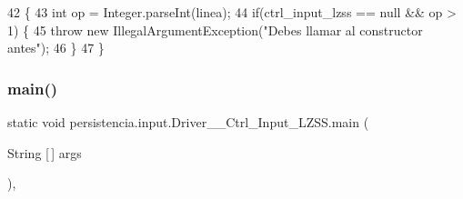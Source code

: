 \begin{DoxyCode}
42                                                                                           \{
43         \textcolor{keywordtype}{int} op = Integer.parseInt(linea);
44         \textcolor{keywordflow}{if}(ctrl\_input\_lzss == null && op > 1) \{
45             \textcolor{keywordflow}{throw} \textcolor{keyword}{new} IllegalArgumentException(\textcolor{stringliteral}{"Debes llamar al constructor antes"});
46         \}
47     \}
\end{DoxyCode}
\mbox{\label{classpersistencia_1_1input_1_1Driver____Ctrl__Input__LZSS_a28b3106d1ed28319e5a7066c975da375}} 
\subsubsection{\texorpdfstring{main()}{main()}}
{\footnotesize\ttfamily static void persistencia.\+input.\+Driver\+\_\+\+\_\+\+Ctrl\+\_\+\+Input\+\_\+\+L\+Z\+S\+S.\+main (\begin{DoxyParamCaption}\item[{String \mbox{[}$\,$\mbox{]}}]{args }\end{DoxyParamCaption})\hspace{0.3cm}{\ttfamily [inline]}, {\ttfamily [static]}}


